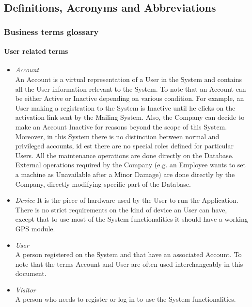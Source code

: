 \subsection{Definitions, Acronyms and Abbreviations}
\subsubsection{Business terms glossary}
\paragraph{User related terms}
\begin{itemize}
	\item \emph{Account} \\
	An Account is a virtual representation of a User in the System and contains all the User information relevant to the System. To note that an Account can be either Active or Inactive depending on various condition. For example, an User making a registration to the System is Inactive until he clicks on the activation link sent by the Mailing System. Also, the Company can decide to make an Account Inactive for reasons beyond the scope of this System.
	Moreover, in this System there is no distinction between normal and privileged accounts, id est there are no special roles defined for particular Users. All the maintenance operations are done directly on the Database.
	External operations required by the Company (e.g. an Employee wants to set a machine as Unavailable after a Minor Damage) are done directly by the Company, directly modifying specific part of the Database.
	
	\item \emph{Device}
	It is the piece of hardware used by the User to run the Application. There is no strict requirements on the kind of device an User can have, except that to use most of the System functionalities it should have a working GPS module.
			
	\item \emph{User}\\
	A person registered on the System and that have an associated Account. To note that the terms Account and User are often used interchangeably in this document.

	\item \emph{Visitor}\\
	A person who needs to register or log in to use the System functionalities.	
	\end{itemize}
	
